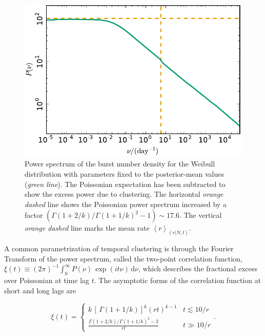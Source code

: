 \documentclass[fleqn,usenatbib]{mnras}
\newcommand{\new}[1]{#1}
\begin{document}
\begin{figure}
	\includegraphics[width=1.0\columnwidth]{powspec_weibull.pdf}
	\caption{\label{fig:powspec}\new{Power spectrum of the burst number density for the Weibull distribution with parameters fixed to the posterior-mean values (\emph{green line}). The Poissonian expectation has been subtracted to show the excess power due to clustering. The horizontal \emph{orange dashed} line shows the Poissonian power spectrum increased by a factor $(\Gamma(1 + 2/k)/\Gamma(1 + 1/k)^2 - 1)\sim 17.6$. The vertical \emph{orange dashed} line marks the mean rate $\left<r\right>_{(r|N,t)}$.}}
\end{figure}

\new{
A common parametrization of temporal clustering is through the Fourier
Transform of the power spectrum, called the two-point correlation function, $\xi(t) \equiv (2\pi)^{-1}\int_0^\infty
P(\nu) \, \exp(i t\nu)\, \mathrm{d}\nu$, which describes the fractional 
excess over Poissonian at time lag $t$. The asymptotic forms of the
correlation function at short and long lags are
}
\begin{equation}
\xi(t)=\left\{ \begin{array}{ll}  k \, \left[\, \Gamma\left(1 + 1/k\right)\right]^k  (rt)^{k-1} & t \lesssim 10/r \\
               \frac{ \Gamma(1 + 2/k)/\Gamma(1 + 1/k)^2 - 2}{rt} & t \gg 10/r\end{array} \right..
\end{equation}

\end{document}
